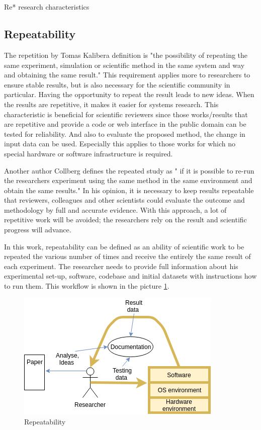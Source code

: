 \documentclass{vldb}
\begin{document}
\section{}{Re* research characteristics}
\subsection{Repeatability}
The repetition by Tomas Kalibera\cite{DBLP:conf/popl/Vitek15} definition is "the possibility of repeating the same experiment, simulation or scientific method in the same system and way and obtaining the same result." This requirement applies more to researchers to ensure stable results, but is also necessary for the scientific community in particular. Having the opportunity to repeat the result leads to new ideas. When the results are repetitive, it makes it easier for systems research. This characteristic is beneficial for scientific reviewers since those works/results that are repetitive and provide a code or web interface in the public domain can be tested for reliability. And also to evaluate the proposed method, the change in input data can be used. Especially this applies to those works for which no special hardware or software infrastructure is required. \par
Another author Collberg\cite{DBLP:journals/cacm/CollbergP16} defines the repeated study as " if it is possible to re-run the researchers experiment using the same method in the same environment and obtain the same results." In his opinion, it is necessary to keep results repeatable that reviewers, colleagues and other scientists could evaluate the outcome and methodology by full and accurate evidence. With this approach, a lot of repetitive work will be avoided; the researchers rely on the result and scientific progress will advance. \par
In this work, repeatability can be defined as an ability of scientific work to be repeated the various number of times and receive the entirely the same result of each experiment. The researcher needs to provide full information about his experimental set-up, software, codebase and initial datasets with instructions how to run them. This workflow is shown in the picture \ref{fig:repeatability}. \par
\begin{figure}[h!]
  \includegraphics[scale=0.6]{fig/repeatability.png}
  \caption{Repeatability}
  \label{fig:repeatability}
\end{figure}
\end{document}
